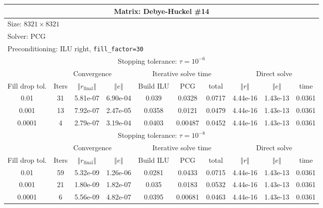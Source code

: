 \documentclass[oneside,final]{amsart}  %
\begin{document}
\begin{tabular}{|c|c|c|c|c|c|c|c|c|c|}
\hline
\multicolumn{10}{|c|}{Matrix: Debye-Huckel \#14}\tabularnewline
\hline
  \multicolumn{10}{|l|}{Size: $8321\times8321$}\tabularnewline
\hline
\multicolumn{10}{|l|}{Solver: PCG}\tabularnewline
\hline
\multicolumn{10}{|l|}{Preconditioning: ILU right, \texttt{fill\_factor=30}}\tabularnewline
\hline
\hline
\multicolumn{10}{|c|}{Stopping tolerance: $\tau=10^{-6}$}\tabularnewline
\hline
\hline
 & \multicolumn{3}{c|}{Convergence} & \multicolumn{3}{c|}{Iterative solve time} & \multicolumn{3}{c|}{Direct solve}\tabularnewline
\hline
Fill drop tol.  & Iters & $\left\Vert r_{\text{final}}\right\Vert $  & $\left\Vert e\right\Vert $  & Build ILU  & PCG  & total  & $\left\Vert r\right\Vert $ & $\left\Vert e\right\Vert $  & time\tabularnewline
\hline
  0.01 & 31 & 5.81e-07 & 6.90e-04 &      0.039 &     0.0328 &     0.0717 & 4.44e-16 & 1.43e-13 &     0.0361\\
  \hline
  0.001 & 13 & 7.92e-07 & 2.47e-05 &     0.0358 &     0.0121 &     0.0479 & 4.44e-16 & 1.43e-13 &     0.0361\\
  \hline
  0.0001 & 4 & 2.79e-07 & 3.19e-04 &     0.0403 &    0.00487 &     0.0452 & 4.44e-16 & 1.43e-13 &     0.0361\\
  \hline
\hline
\multicolumn{10}{|c|}{Stopping tolerance: $\tau=10^{-8}$}\tabularnewline
\hline
\hline
 & \multicolumn{3}{c|}{Convergence} & \multicolumn{3}{c|}{Iterative solve time} & \multicolumn{3}{c|}{Direct solve }\tabularnewline
\hline
Fill drop tol.  & Iters  & $\left\Vert r_{\text{final}}\right\Vert $  & $\left\Vert e\right\Vert $ & Build ILU  & PCG  & total  & $\left\Vert r\right\Vert $  & $\left\Vert e\right\Vert $  & time\tabularnewline
\hline
  0.01 & 59 & 5.32e-09 & 1.26e-06 &     0.0281 &     0.0433 &     0.0715 & 4.44e-16 & 1.43e-13 &     0.0361\\
  \hline
  0.001 & 21 & 1.80e-09 & 1.82e-07 &      0.035 &     0.0183 &     0.0532 & 4.44e-16 & 1.43e-13 &     0.0361\\
  \hline
  0.0001 & 6 & 5.56e-09 & 4.82e-07 &     0.0395 &    0.00681 &     0.0463 & 4.44e-16 & 1.43e-13 &     0.0361\\
  \hline
\end{tabular}
\end{document}
